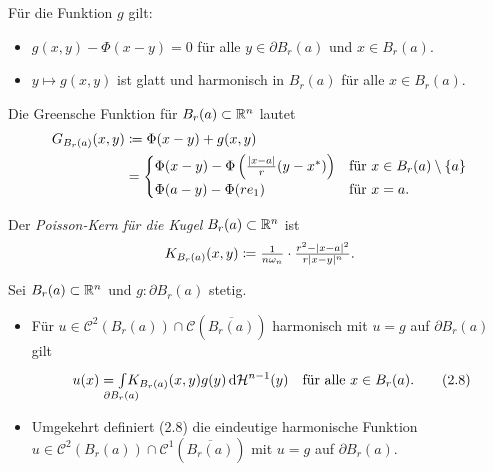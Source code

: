 \documentclass{cheat-sheet}
\newcommand{\HM}{\mathcal{H}} %
\begin{document}
\begin{prop}
  Für die Funktion $g$ gilt:
  \begin{itemize}
    \item $g(x, y) - \Phi(x - y) = 0$ für alle $y \in \partial B_r(a)$ und $x \in B_r(a)$.
    \item $y \mapsto g(x, y)$ ist glatt und harmonisch in $B_r(a)$ für alle $x \in B_r(a)$.
  \end{itemize}
\end{prop}

\begin{kor}
  Die Greensche Funktion für $B_r(a) \subset \mathbb{R}^n$ lautet
  \begin{align*}
    G_{B_r(a)}(x, y) &\coloneqq \Phi(x - y) + g(x, y)\\
    &= \begin{cases}
      \Phi(x - y) - \Phi\left(\tfrac{\lvert x-a\rvert}{r} (y - x^*)\right) & \text{für $x \in B_r(a) \setminus \{ a \}$}\\
      \Phi(a - y) - \Phi(r e_1) & \text{für $x = a$.}
    \end{cases}
  \end{align*}
\end{kor}

\begin{defn}
  Der \emph{Poisson-Kern für die Kugel} $B_r(a) \subset \mathbb{R}^n$ ist
  \[ K_{B_r(a)}(x, y) \coloneqq \tfrac{1}{n \omega_n} \cdot \tfrac{r^2 - \lvert x - a\rvert^2}{r \lvert x - y\rvert^n}. \]
\end{defn}

\begin{satz}
  Sei $B_r(a) \subset \mathbb{R}^n$ und $g : \partial B_r(a)$ stetig.
  \begin{itemize}
    \item Für $u {\in} \mathcal{C}^2(B_r(a)) \cap \mathcal{C}(\overline{B_r(a)})$ harmonisch mit $u {=} g$ auf $\partial B_r(a)$ gilt
    \[
      u(x) = \Int{\mathclap{\partial B_r(a)}}{}{K_{B_r(a)}(x,y) g(y)}{\HM^{n-1}(y)}
      \quad \text{für alle $x \in B_r(a)$.} \tag{2.8}
    \]
    \item Umgekehrt definiert (2.8) die eindeutige harmonische Funktion $u \in \mathcal{C}^2(B_r(a)) \cap \mathcal{C}^1(\overline{B_r(a)})$ mit $u = g$ auf $\partial B_r(a)$.
  \end{itemize}
\end{satz}

\end{document}
